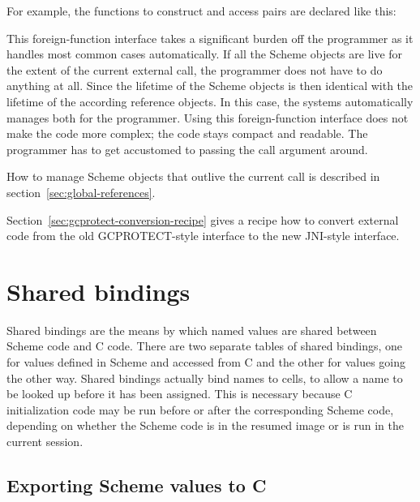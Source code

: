 For example, the functions to construct and access pairs are declared
like this:

\begin{protos}
\end{protos}

This foreign-function interface takes a significant burden off the
programmer as it handles most common cases automatically.  If all the
Scheme objects are live for the extent of the current external call,
the programmer does not have to do anything at all.  Since the
lifetime of the Scheme objects is then identical with the lifetime of
the according reference objects.  In this case, the systems
automatically manages both for the programmer.  Using this
foreign-function interface does not make the code more complex; the
code stays compact and readable.  The programmer has to get accustomed
to passing the call argument around.

How to manage Scheme objects that outlive the current call is described
in section~\ref{sec:global-references}.

Section~\ref{sec:gcprotect-conversion-recipe} gives a recipe how to
convert external code from the old GCPROTECT-style interface to the
new JNI-style interface.


\section{Shared bindings}
\label{sec:shared-bindings}

Shared bindings are the means by which named values are shared between Scheme
 code and C code.
There are two separate tables of shared bindings, one for values defined in
 Scheme and accessed from C and the other for values going the other way.
Shared bindings actually bind names to cells, to allow a name to be looked
 up before it has been assigned.
This is necessary because C initialization code may be run before or after
 the corresponding Scheme code, depending on whether the Scheme code is in
 the resumed image or is run in the current session.

\subsection{Exporting Scheme values to C}
\label{sec:export-scheme-to-c}

